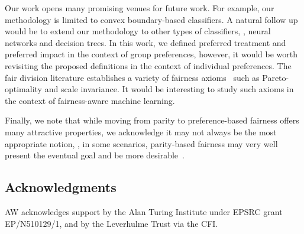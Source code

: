 \documentclass{article}
\begin{document}
Our work opens many promising venues for future work. For example, our methodology is limited to convex boundary-based classifiers. A natural follow up would be to
extend our methodology to other types of classifiers, \eg, neural networks and decision trees.
In this work, we defined preferred treatment and preferred impact in the context of group preferences, however, it would be worth revisiting the proposed definitions in the
context of individual preferences.
The fair division literature establishes a variety of fairness axioms~\cite{nash1950bargaining} such as Pareto-optimality and scale invariance. It would be interesting
to study such axioms in the context of fairness-aware machine learning.

Finally, we note that while moving from parity to preference-based fairness offers many attractive properties, we acknowledge it may not always be the most
appropriate notion, \eg, in some scenarios, parity-based fairness may very well present the eventual goal and be more desirable~\cite{plato-disc}.










\subsection*{Acknowledgments}
AW acknowledges support by the Alan Turing Institute under EPSRC grant EP/N510129/1, and by the Leverhulme Trust via the CFI.
\end{document}
